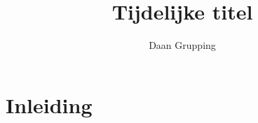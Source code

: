 \documentclass{article}
\title{Tijdelijke titel}
\author{Daan Grupping}
\begin{document}
\maketitle
\newpage
\section{Inleiding}
\end{document}
